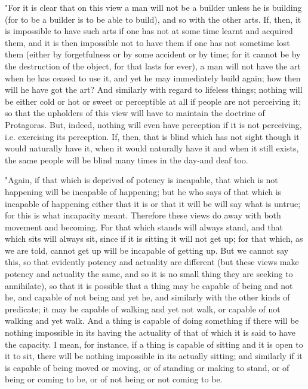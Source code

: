 "For it is clear that on this view a man will not be a builder unless
he is building (for to be a builder is to be able to build), and so
with the other arts. If, then, it is impossible to have such arts
if one has not at some time learnt and acquired them, and it is then
impossible not to have them if one has not sometime lost them (either
by forgetfulness or by some accident or by time; for it cannot be
by the destruction of the object, for that lasts for ever), a man
will not have the art when he has ceased to use it, and yet he may
immediately build again; how then will he have got the art? And similarly
with regard to lifeless things; nothing will be either cold or hot
or sweet or perceptible at all if people are not perceiving it; so
that the upholders of this view will have to maintain the doctrine
of Protagoras. But, indeed, nothing will even have perception if it
is not perceiving, i.e. exercising its perception. If, then, that
is blind which has not sight though it would naturally have it, when
it would naturally have it and when it still exists, the same people
will be blind many times in the day-and deaf too. 

"Again, if that which is deprived of potency is incapable, that which
is not happening will be incapable of happening; but he who says of
that which is incapable of happening either that it is or that it
will be will say what is untrue; for this is what incapacity meant.
Therefore these views do away with both movement and becoming. For
that which stands will always stand, and that which sits will always
sit, since if it is sitting it will not get up; for that which, as
we are told, cannot get up will be incapable of getting up. But we
cannot say this, so that evidently potency and actuality are different
(but these views make potency and actuality the same, and so it is
no small thing they are seeking to annihilate), so that it is possible
that a thing may be capable of being and not he, and capable of not
being and yet he, and similarly with the other kinds of predicate;
it may be capable of walking and yet not walk, or capable of not walking
and yet walk. And a thing is capable of doing something if there will
be nothing impossible in its having the actuality of that of which
it is said to have the capacity. I mean, for instance, if a thing
is capable of sitting and it is open to it to sit, there will be nothing
impossible in its actually sitting; and similarly if it is capable
of being moved or moving, or of standing or making to stand, or of
being or coming to be, or of not being or not coming to be.

